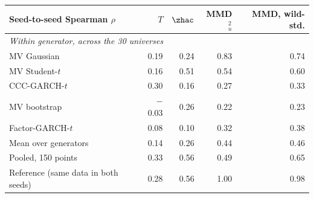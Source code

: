 \begin{tabular}{lrrrr}
\toprule
Seed-to-seed Spearman $\rho$ & \WC{} $T$ & \WC{} $\zhac$ & MMD$^2_u$ & MMD, wild-std. \\
\midrule
\multicolumn{5}{l}{\emph{Within generator, across the 30 universes}} \\
MV Gaussian & 0.19 & 0.24 & 0.83 & 0.74 \\
MV Student-$t$ & 0.16 & 0.51 & 0.54 & 0.60 \\
CCC-GARCH-$t$ & 0.30 & 0.16 & 0.27 & 0.33 \\
MV bootstrap & $-$0.03 & 0.26 & 0.22 & 0.23 \\
Factor-GARCH-$t$ & 0.08 & 0.10 & 0.32 & 0.38 \\
Mean over generators & 0.14 & 0.26 & 0.44 & 0.46 \\
\midrule
Pooled, 150 points & 0.33 & 0.56 & 0.49 & 0.65 \\
Reference (same data in both seeds) & 0.28 & 0.56 & 1.00 & 0.98 \\
\bottomrule
\end{tabular}
